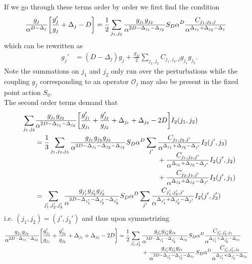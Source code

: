 \documentclass[english, parskip=full]{scrartcl}
\begin{document}
If we go through these terms order by order we first find the condition
\begin{align}
\frac{g_{j}}{\alpha^{D-\Delta_{j}}} \klb*{\frac{g_{j}'}{g_{j}} + \Delta_{j} - D} &=  \frac{1}{2} \sum_{j_1,j_2} \frac{g_{j_1}g_{j_2}}{\alpha^{2D-\Delta_{j_1} - \Delta_{j_2}}} S_D\alpha^D \frac{C_{j_{1}, j_{2}, j}}{\alpha^{\Delta_{j_{1}} + \Delta_{j_{2}} - \Delta_{j}}}
\end{align}
which can be rewritten as
\begin{align}
g_j' &= (D-\Delta_j)g_j + \frac{S_D}{2} \sum_{j_1,j_2} C_{j_1,j_2,j} g_{j_1} g_{j_2}.
\end{align}
Note the summations on $j_1$ and $j_2$ only run over the perturbations while the coupling $g_j$ corresponding to an operator $\mathcal{O}_j$ may also be present in the fixed point action $S_0$.\\
The second order terms demand that
\begin{align}
\sum_{j_1,j_2} &\frac{g_{j_1}g_{j_2}}{\alpha^{2D-\Delta_{j_1} - \Delta_{j_2}}} \klb*{\frac{g_{j_1}'}{g_{j_1}} + \frac{g_{j_2}'}{g_{j_2}} + \Delta_{j_1} + \Delta_{j_2} - 2D} I_2(j_1,j_2) \\
&= \frac{1}{3}\sum_{j_1,j_2,j_3} \frac{g_{j_1}g_{j_2}g_{j_3}}{\alpha^{3D-\Delta_{j_1} - \Delta_{j_2} - \Delta_{j_3}}} S_D\alpha^D \sum_{j'} \bsplit{&\frac{C_{j_{1}, j_{2}, j'}}{\alpha^{\Delta_{j_{1}} + \Delta_{j_{2}} - \Delta_{j'}}} I_{2}(j',j_3)\\
&+\frac{C_{j_{1}, j_{3}, j'}}{\alpha^{\Delta_{j_{1}} + \Delta_{j_{3}} - \Delta_{j'}}} I_{2}(j',j_2)\\
&+ \frac{C_{j_{2}, j_{3}, j'}}{\alpha^{\Delta_{j_{2}} + \Delta_{j_{3}} - \Delta_{j'}}} I_{2}(j',j_1)}\\
&= \sum_{j_1',j_2',j_3'} \frac{g_{j_1'}g_{j_2'}g_{j_3'}}{\alpha^{3D-\Delta_{j_1'} - \Delta_{j_2'} - \Delta_{j_3'}}} S_D\alpha^D \sum_{j'}\frac{C_{j_{1}', j_{2}', j'}}{\alpha^{\Delta_{j_{1}'} + \Delta_{j_{2}'} - \Delta_{j'}}} I_{2}(j',j_3')
\end{align}
i.e. $(j_1,j_2)=(j',j_3')$ and thus upon symmetrizing
\begin{align}
\frac{g_{j_1}g_{j_2}}{\alpha^{2D-\Delta_{j_1} - \Delta_{j_2}}} \klb*{\frac{g_{j_1}'}{g_{j_1}} + \frac{g_{j_2}'}{g_{j_2}} + \Delta_{j_1} + \Delta_{j_2} - 2D} &= \frac{1}{2}\sum_{j_1',j_2'}\bsplit{& \frac{g_{j_1'}g_{j_2'}g_{j_2}}{\alpha^{3D-\Delta_{j_1'} - \Delta_{j_2'} - \Delta_{j_2}}} S_D\alpha^D \frac{C_{j_{1}', j_{2}', j_1}}{\alpha^{\Delta_{j_{1}'} + \Delta_{j_{2}'} - \Delta_{j_1}}}\\
&+ \frac{g_{j_1'}g_{j_2'}g_{j_1}}{\alpha^{3D-\Delta_{j_1'} - \Delta_{j_2'} - \Delta_{j_1}}} S_D\alpha^D \frac{C_{j_{1}', j_{2}', j_2}}{\alpha^{\Delta_{j_{1}'} + \Delta_{j_{2}'} - \Delta_{j_2}}}}
\end{align}
\end{document}
